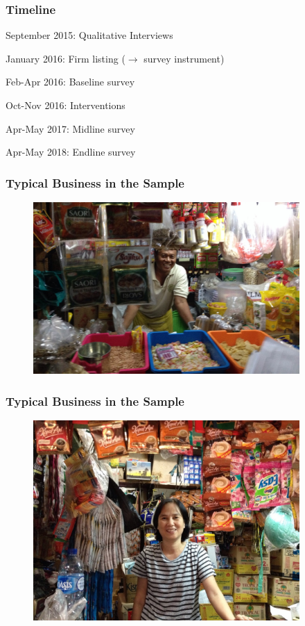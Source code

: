 \documentclass[hideothersubsections, usenames,dvipsnames,11pt]{beamer}
\newenvironment{enumerate_2pt}{\enumerate\addtolength{\itemsep}{2pt}}{\endenumerate}
\begin{document}
\begin{frame}
\frametitle{Timeline}
\begin{enumerate_2pt}
    \item September 2015: \textcolor{bdf}{Qualitative} Interviews
    \item January 2016: \textcolor{bdf}{Firm listing} ($\rightarrow$ survey instrument)
    \item Feb-Apr 2016: \textcolor{bdf}{Baseline} survey
    \item Oct-Nov 2016: \textcolor{bdf}{Interventions}
    \item Apr-May 2017: \textcolor{bdf}{Midline} survey
    \item Apr-May 2018: \textcolor{bdf}{Endline} survey
\end{enumerate_2pt}
\end{frame}


\begin{frame}
\frametitle{Typical Business in the Sample}

\begin{figure}[htbp]
	\centering
		\includegraphics[width=4in]{pics/retailer1.jpg}
	\label{height}
\end{figure}
\end{frame}

\begin{frame}
\frametitle{Typical Business in the Sample}

\begin{figure}[htbp]
	\centering
		\includegraphics[width=4in]{pics/retailer2.jpg}
	\label{height}
\end{figure}
\end{frame}
\end{document}
